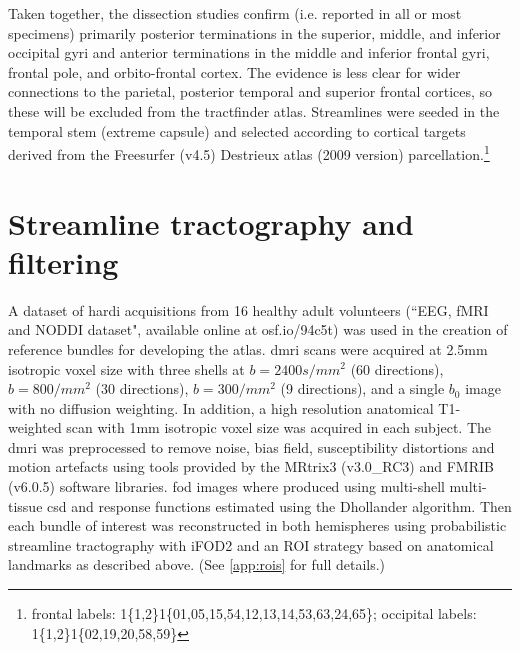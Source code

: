 Taken together, the dissection studies confirm (i.e. reported in all or most specimens) primarily posterior terminations in the superior, middle, and inferior occipital gyri and anterior terminations in the middle and inferior frontal gyri, frontal pole, and orbito-frontal cortex.
The evidence is less clear for wider connections to the parietal, posterior temporal and superior frontal cortices, so these will be excluded from the tractfinder atlas.
Streamlines were seeded in the temporal stem (extreme capsule) and selected according to cortical targets derived from the Freesurfer (v4.5) Destrieux atlas\autocite{Destrieux2010} (2009 version) parcellation.\footnote{frontal labels: 1\{1,2\}1\{01,05,15,54,12,13,14,53,63,24,65\}; occipital labels: 1\{1,2\}1\{02,19,20,58,59\}}

\section{Streamline tractography and filtering}

A dataset of \gls{hardi} acquisitions from 16 healthy adult volunteers (``EEG, fMRI and NODDI dataset",\autocite{Clayden2020} available online at osf.io/94c5t) was used in the creation of reference bundles for developing the atlas.
\Gls{dmri} scans were acquired at 2.5mm isotropic voxel size with three shells at $b=2400s/mm^2$ (60 directions), $b=800/mm^2$ (30 directions), $b=300/mm^2$ (9 directions), and a single $b_0$ image with no diffusion weighting.
In addition, a high resolution anatomical T1-weighted scan with 1mm isotropic voxel size was acquired in each subject.
The \gls{dmri} was preprocessed to remove noise, bias field, susceptibility distortions and motion artefacts using tools provided by the MRtrix3 (v3.0\_RC3) and FMRIB (v6.0.5) software libraries.
\gls{fod} images where produced using multi-shell multi-tissue \gls{csd}\autocite{Jeurissen2014,Tournier2019} and response functions estimated using the Dhollander algorithm.\autocite{Dhollander2016}
Then each bundle of interest was reconstructed in both hemispheres using probabilistic streamline tractography with iFOD2 \autocite{Tournier2010} and an ROI strategy based on anatomical landmarks as described above. (See \ref{app:rois} for full details.)

